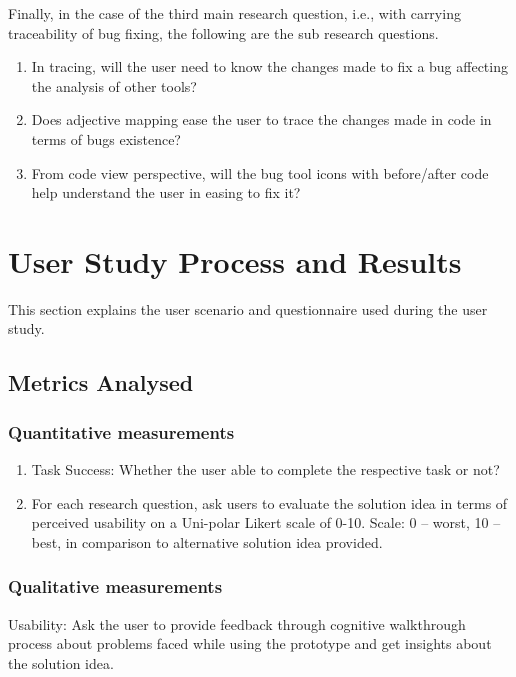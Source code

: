Finally, in the case of the third main research question, i.e., with carrying traceability of bug fixing, the following are the sub research questions. \\

\begin{enumerate}
\item In tracing, will the user need to know the changes made to fix a bug affecting the analysis of other tools?
\item Does adjective mapping ease the user to trace the changes made in code in terms of bugs existence?
\item From code view perspective, will the bug tool icons with before/after code help understand the user in easing to fix it?
\end{enumerate} 

\section{User Study Process and Results}

This section explains the user scenario and questionnaire used during the user study.

\subsection{Metrics Analysed}

\subsubsection{Quantitative measurements}  

\begin{enumerate}
	\item Task Success: Whether the user able to complete the respective task or not?
	\item For each research question, ask users to evaluate the solution idea in terms of perceived usability on a Uni-polar Likert scale of 0-10. Scale: 0 – worst, 10 – best, in comparison to alternative solution idea provided.
\end{enumerate} 

\subsubsection{Qualitative measurements} 

Usability: Ask the user to provide feedback through cognitive walkthrough process about problems faced while using the prototype and get insights about the solution idea. \\

